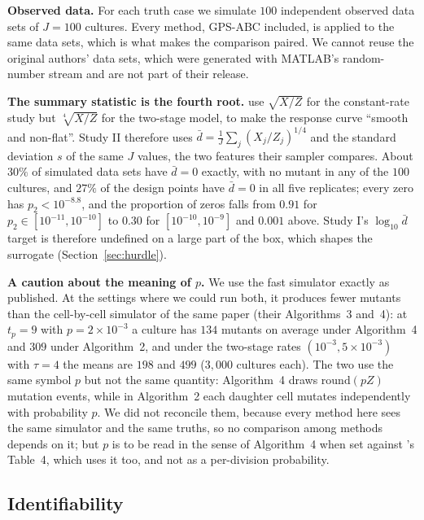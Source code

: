 \documentclass[sn-basic,iicol,pdflatex]{sn-jnl}
\begin{document}
\noindent\textbf{Observed data.} For each truth case we simulate $100$ independent
observed data sets of $J=100$ cultures. Every method, GPS-ABC included, is
applied to the same data sets, which is what makes the comparison paired. We
cannot reuse the original authors' data sets, which were generated with
MATLAB's random-number stream and are not part of their release.

\noindent\textbf{The summary statistic is the fourth root.} \citeauthor{lu2023}
use $\sqrt{X/Z}$ for the constant-rate study but $\sqrt[4]{X/Z}$ for the
two-stage model, to make the response curve ``smooth and non-flat''. Study II
therefore uses $\bar d=\frac1J\sum_j(X_j/Z_j)^{1/4}$ and the standard deviation
$s$ of the same $J$ values, the two features their sampler compares. About
$30\%$ of simulated data sets have $\bar d=0$ exactly, with no mutant in any of
the $100$ cultures, and $27\%$ of the design points have $\bar d=0$ in all five
replicates; every zero has $p_2<10^{-8.8}$, and the proportion of zeros falls
from $0.91$ for $p_2\in[10^{-11},10^{-10}]$ to $0.30$ for $[10^{-10},10^{-9}]$ and $0.001$ above. Study I's $\log_{10}\bar d$
target is therefore undefined on a large part of the box, which shapes the
surrogate (Section~\ref{sec:hurdle}).

\noindent\textbf{A caution about the meaning of $p$.} We use the fast simulator
exactly as published. At the settings where we could run both, it produces
fewer mutants than the cell-by-cell simulator of the same paper (their
Algorithms~3 and~4): at $t_p=9$ with $p=2\times10^{-3}$ a culture has $134$
mutants on average under Algorithm~4 and $309$ under Algorithm~2, and under the
two-stage rates $(10^{-3},5\times10^{-3})$ with $\tau=4$ the means are $198$ and
$499$ ($3{,}000$ cultures each). The two use the same symbol $p$ but not the
same quantity: Algorithm~4 draws $\mathrm{round}(pZ)$ mutation events, while in
Algorithm~2 each daughter cell mutates independently with probability $p$. We
did not reconcile them, because every method here sees the same simulator and
the same truths, so no comparison among methods depends on it; but $p$ is to be
read in the sense of Algorithm~4 when set against \citeauthor{lu2023}'s Table~4,
which uses it too, and not as a per-division probability.

\subsection{Identifiability}
\label{sec:sim3D_identifiability}
\end{document}
